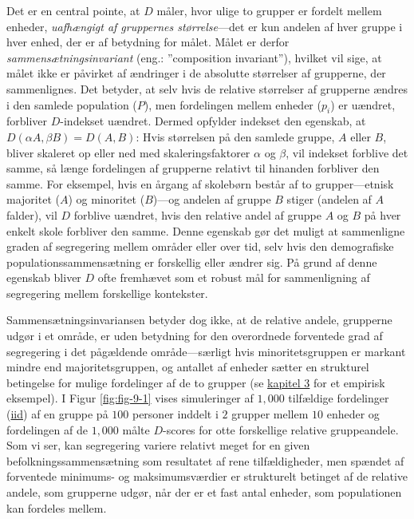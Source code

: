 \documentclass[
]{book}
\begin{document}
Det er en central pointe, at \(D\) måler, hvor ulige to grupper er fordelt mellem enheder, \emph{uafhængigt af gruppernes størrelse}---det er kun andelen af hver gruppe i hver enhed, der er af betydning for målet. Målet er derfor \emph{sammensætningsinvariant} (eng.: ''composition invariant''), hvilket vil sige, at målet ikke er påvirket af ændringer i de absolutte størrelser af grupperne, der sammenlignes. Det betyder, at selv hvis de relative størrelser af grupperne ændres i den samlede population (\(P\)), men fordelingen mellem enheder (\(p_{i}\)) er uændret, forbliver \(D\)-indekset uændret. Dermed opfylder indekset den egenskab, at \(D \left( \alpha A, \beta B \right) = D \left( A, B \right)\): Hvis størrelsen på den samlede gruppe, \(A\) eller \(B\), bliver skaleret op eller ned med skaleringsfaktorer \(\alpha\) og \(\beta\), vil indekset forblive det samme, så længe fordelingen af grupperne relativt til hinanden forbliver den samme. For eksempel, hvis en årgang af skolebørn består af to grupper---etnisk majoritet (\(A\)) og minoritet (\(B\))---og andelen af gruppe \(B\) stiger (andelen af \(A\) falder), vil \(D\) forblive uændret, hvis den relative andel af gruppe \(A\) og \(B\) på hver enkelt skole forbliver den samme. Denne egenskab gør det muligt at sammenligne graden af segregering mellem områder eller over tid, selv hvis den demografiske populationssammensætning er forskellig eller ændrer sig. På grund af denne egenskab bliver \(D\) ofte fremhævet som et robust mål for sammenligning af segregering mellem forskellige kontekster.

Sammensætningsinvariansen betyder dog ikke, at de relative andele, grupperne udgør i et område, er uden betydning for den overordnede forventede grad af segregering i det pågældende område---særligt hvis minoritetsgruppen er markant mindre end majoritetsgruppen, og antallet af enheder sætter en strukturel betingelse for mulige fordelinger af de to grupper (se \hyperref[kap3]{kapitel 3} for et empirisk eksempel). I Figur \ref{fig:fig-9-1} vises simuleringer af \(1,000\) tilfældige fordelinger (\href{https://en.wikipedia.org/wiki/Independent_and_identically_distributed_random_variables}{iid}) af en gruppe på \(100\) personer inddelt i \(2\) grupper mellem \(10\) enheder og fordelingen af de \(1,000\) målte \(D\)-scores for otte forskellige relative gruppeandele. Som vi ser, kan segregering variere relativt meget for en given befolkningssammensætning som resultatet af rene tilfældigheder, men spændet af forventede minimums- og maksimumsværdier er strukturelt betinget af de relative andele, som grupperne udgør, når der er et fast antal enheder, som populationen kan fordeles mellem.
\end{document}

